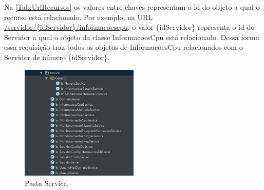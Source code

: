Na \autoref{Tab:UrlRecursos} os valores entre chaves representam o id do objeto a qual o recurso está relacionado. Por exemplo, na URL \url{/servidor/{idServidor}/informacoescpu}, o valor \{idServidor\} representa o id do Servidor a qual o objeto da classe InformacoesCpu está relacionado. Dessa forma essa requisição traz todos os objetos de InformacoesCpu relacionados com o Servidor de número \{idServidor\}.



\begin{figure}[H]
	\centering
	\includegraphics[width=0.5\textwidth]{figuras/estruturaPojetoService.JPG}
	\caption[Pasta Service.]{Pasta Service.}
	\label{Img:estruturaDePastaService}
\end{figure}


